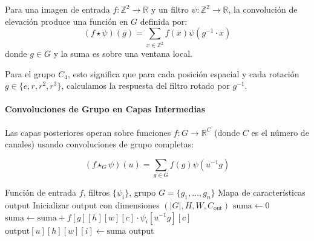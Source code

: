 \begin{definition}
Para una imagen de entrada $f: \mathbb{Z}^2 \to \mathbb{R}$ y un filtro $\psi: \mathbb{Z}^2 \to \mathbb{R}$, la convolución de elevación produce una función en $G$ definida por:
\begin{equation}
(f \star \psi)(g) = \sum_{x \in \mathbb{Z}^2} f(x) \psi(g^{-1} \cdot x)
\label{eq:lifting_convolution}
\end{equation}
donde $g \in G$ y la suma es sobre una ventana local.
\end{definition}

Para el grupo $C_4$, esto significa que para cada posición espacial y cada rotación $g \in \{e, r, r^2, r^3\}$, calculamos la respuesta del filtro rotado por $g^{-1}$.

\paragraph{Convoluciones de Grupo en Capas Intermedias}

Las capas posteriores operan sobre funciones $f: G \to \mathbb{R}^C$ (donde $C$ es el número de canales) usando convoluciones de grupo completas:

\begin{equation}
(f \star_G \psi)(u) = \sum_{g \in G} f(g) \psi(u^{-1}g)
\label{eq:group_conv_discrete}
\end{equation}

\begin{algorithm}[h]
\caption{Convolución G-CNN para Grupo Finito}
\label{alg:gcnn_finite}
\begin{algorithmic}[1]
\Require Función de entrada $f$, filtros $\{\psi_i\}$, grupo $G = \{g_1, \ldots, g_n\}$
\Ensure Mapa de características $\text{output}$
\State Inicializar $\text{output}$ con dimensiones $(|G|, H, W, C_{\text{out}})$
            \State $\text{suma} \leftarrow 0$
                    \State $\text{suma} \leftarrow \text{suma} + f[g][h][w][c] \cdot \psi_i[u^{-1}g][c]$
                \EndFor
            \EndFor
            \State $\text{output}[u][h][w][i] \leftarrow \text{suma}$
        \EndFor
    \EndFor
\EndFor
\Return $\text{output}$
\end{algorithmic}
\end{algorithm}

